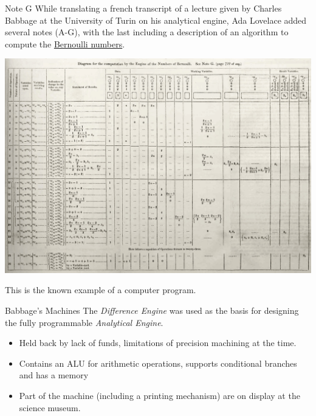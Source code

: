 \begin{sidenotebox}{Note G}
    While translating a french transcript of a lecture given by Charles Babbage at the University of Turin on his analytical engine, Ada Lovelace added several notes (A-G), with the last including a description of an algorithm to compute the \href{https://en.wikipedia.org/wiki/Bernoulli_number}{Bernoulli numbers}.
    \begin{center}
        \includegraphics[width=.8\textwidth]{introduction/images/note_G.jpg}
    \end{center}
    This is the known example of a computer program.
\end{sidenotebox}

\begin{sidenotebox}{Babbage's Machines}
    The \textit{Difference Engine} was used as the basis for designing the fully programmable \textit{Analytical Engine}.
    \begin{itemize}
        \item Held back by lack of funds, limitations of precision machining at the time.
        \item Contains an ALU for arithmetic operations, supports conditional branches and has a memory
        \item Part of the machine (including a printing mechanism) are on display at the science museum.
    \end{itemize}
\end{sidenotebox}

